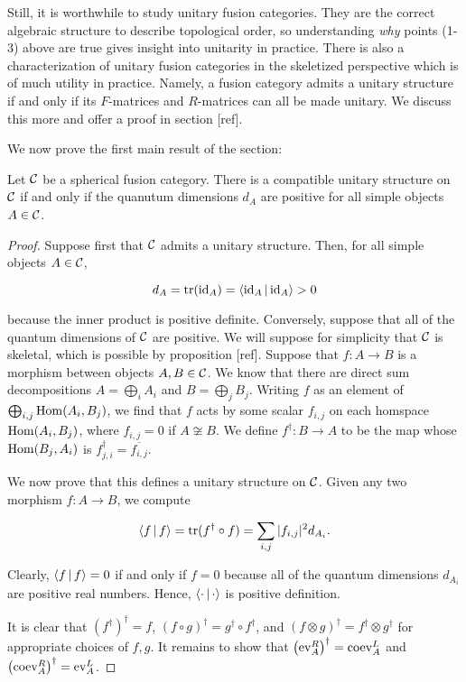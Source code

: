 Still, it is worthwhile to study unitary fusion categories. They are the correct algebraic structure to describe topological order, so understanding \textit{why} points (1-3) above are true gives insight into unitarity in practice. There is also a characterization of unitary fusion categories in the skeletized perspective which is of much utility in practice. Namely, a fusion category admits a unitary structure if and only if its $F$-matrices and $R$-matrices can all be made unitary. We discuss this more and offer a proof in section [ref].

We now prove the first main result of the section:

\begin{prop} Let ${\mathcal C}$ be a spherical fusion category. There is a compatible unitary structure on ${\mathcal C}$ if and only if  the quanutum dimensions $d_A$ are positive for all simple objects $A\in {\mathcal C}$. 
\end{prop}
\begin{proof} Suppose first that ${\mathcal C}$ admits a unitary structure. Then, for all simple objects $A\in {\mathcal C}$,

$$d_A=\operatorname{tr}(\operatorname{id}_{A})=\Braket{\operatorname{id}_{A} | \operatorname{id}_{A}}>0$$

because the inner product is positive definite. Conversely, suppose that all of the quantum dimensions of ${\mathcal C}$ are positive. We will suppose for simplicity that ${\mathcal C}$ is skeletal, which is possible by proposition [ref]. Suppose that $f:A\to B$ is a morphism between objects $A,B\in {\mathcal C}$. We know that there are direct sum decompositions $A=\bigoplus_{i}A_i$ and $B=\bigoplus_{j}B_j$. Writing $f$ as an element of $\bigoplus_{i,j}\operatorname{Hom}(A_i,B_j)$, we find that $f$ acts by some scalar $f_{i,j}$ on each homspace $\operatorname{Hom}(A_i,B_j)$, where $f_{i,j}=0$ if $A\not\cong B$. We define $f^{\dagger}: B\to A$ to be the map whose $\operatorname{Hom}(B_j,A_i)$ is $f_{j,i}^{\dagger}=\overline{f_{i,j}}$.

We now prove that this defines a unitary structure on ${\mathcal C}$. Given any two morphism $f:A\to B$, we compute

$$\Braket{f|f}=\operatorname{tr}(f^{\dagger}\circ f)=\sum_{i,j}|f_{i,j}|^2d_{A_i}.$$

Clearly, $\Braket{f|f}=0$ if and only if $f=0$ because all of the quantum dimensions $d_{A_i}$ are positive real numbers. Hence, $\Braket{\cdot|\cdot}$ is positive definition.

It is clear that $(f^{\dagger})^{\dagger}=f$, $(f\circ g)^{\dagger}=g^{\dagger}\circ f^{\dagger}$,  and $(f\otimes g)^{\dagger}=f^{\dagger}\otimes g^{\dagger}$ for appropriate choices of $f,g$. It remains to show that $\left(\operatorname{ev}^R_{A}\right)^{\dagger}=\operatorname{coev}^{L}_A$ and $\left(\operatorname{coev}^{R}_A\right)^{\dagger}=\operatorname{ev}^L_A$.

\end{proof}

